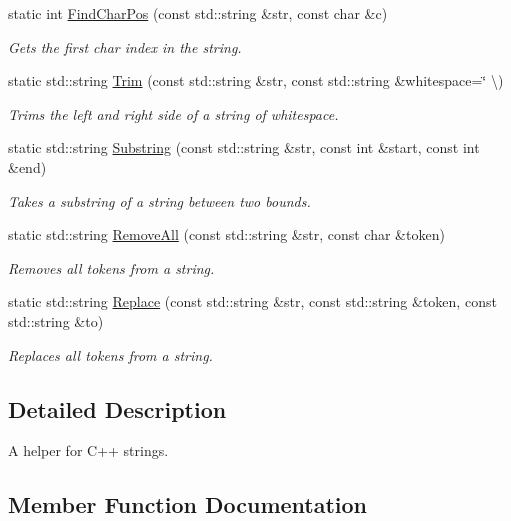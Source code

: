 \begin{DoxyCompactItemize}
static int \hyperlink{class_flounder_1_1_helper_string_aac5512766392af54303eb3c2d5ce306b}{Find\+Char\+Pos} (const std\+::string \&str, const char \&c)
\begin{DoxyCompactList}\small\item\em Gets the first char index in the string. \end{DoxyCompactList}\item 
static std\+::string \hyperlink{class_flounder_1_1_helper_string_af2587d16d5d63f591f16a72260df082e}{Trim} (const std\+::string \&str, const std\+::string \&whitespace=\char`\"{} \textbackslash{})
\begin{DoxyCompactList}\small\item\em Trims the left and right side of a string of whitespace. \end{DoxyCompactList}\item 
static std\+::string \hyperlink{class_flounder_1_1_helper_string_a3de4b301d88832e0a0123a1aa197d9cd}{Substring} (const std\+::string \&str, const int \&start, const int \&end)
\begin{DoxyCompactList}\small\item\em Takes a substring of a string between two bounds. \end{DoxyCompactList}\item 
static std\+::string \hyperlink{class_flounder_1_1_helper_string_a961f2fe767f03aac01d5792ee20302e4}{Remove\+All} (const std\+::string \&str, const char \&token)
\begin{DoxyCompactList}\small\item\em Removes all tokens from a string. \end{DoxyCompactList}\item 
static std\+::string \hyperlink{class_flounder_1_1_helper_string_a05131aa25732ee98338ab6715fa0cd77}{Replace} (const std\+::string \&str, const std\+::string \&token, const std\+::string \&to)
\begin{DoxyCompactList}\small\item\em Replaces all tokens from a string. \end{DoxyCompactList}\end{DoxyCompactItemize}


\subsection{Detailed Description}
A helper for C++ strings. 



\subsection{Member Function Documentation}
\mbox{\label{class_flounder_1_1_helper_string_a064412f1f60e9de697f24104226ad1f8}} 
